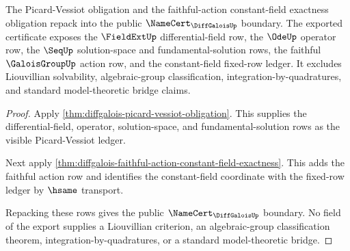 \begin{theorem}
\label{thm:diffgalois-public-certificate-export}
The Picard-Vessiot obligation and the faithful-action constant-field exactness
obligation repack into the public $\NameCert_{\DiffGaloisUp}$ boundary. The
exported certificate exposes the $\FieldExtUp$ differential-field row, the
$\OdeUp$ operator row, the $\SeqUp$ solution-space and fundamental-solution
rows, the faithful $\GaloisGroupUp$ action row, and the constant-field
fixed-row ledger. It excludes Liouvillian solvability, algebraic-group
classification, integration-by-quadratures, and standard model-theoretic
bridge claims.
\end{theorem}
\begin{proof}
Apply \autoref{thm:diffgalois-picard-vessiot-obligation}. This supplies the
differential-field, operator, solution-space, and fundamental-solution rows as
the visible Picard-Vessiot ledger.

Next apply
\autoref{thm:diffgalois-faithful-action-constant-field-exactness}. This adds
the faithful action row and identifies the constant-field coordinate with the
fixed-row ledger by $\hsame$ transport.

Repacking these rows gives the public $\NameCert_{\DiffGaloisUp}$ boundary.
No field of the export supplies a Liouvillian criterion, an algebraic-group
classification theorem, integration-by-quadratures, or a standard
model-theoretic bridge.
\end{proof}

